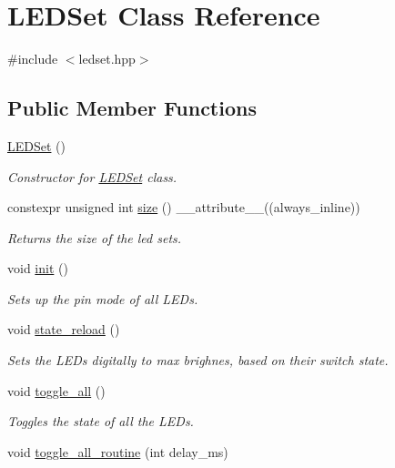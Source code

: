\hypertarget{classLEDSet}{}\section{L\+E\+D\+Set Class Reference}
\label{classLEDSet}


{\ttfamily \#include $<$ledset.\+hpp$>$}

\subsection*{Public Member Functions}
\begin{DoxyCompactItemize}
\item 
\hyperlink{classLEDSet_a4a65c9b26a11c2e62e65170d1088e201}{L\+E\+D\+Set} ()
\begin{DoxyCompactList}\small\item\em Constructor for \hyperlink{classLEDSet}{L\+E\+D\+Set} class. \end{DoxyCompactList}\item 
constexpr unsigned int \hyperlink{classLEDSet_a21b51a375a8487fb89deaa2fbd3701df}{size} () \+\_\+\+\_\+attribute\+\_\+\+\_\+((always\+\_\+inline))
\begin{DoxyCompactList}\small\item\em Returns the size of the led sets. \end{DoxyCompactList}\item 
void \hyperlink{classLEDSet_a907747547c2967c4db9597247c0acd9c}{init} ()
\begin{DoxyCompactList}\small\item\em Sets up the pin mode of all L\+E\+Ds. \end{DoxyCompactList}\item 
void \hyperlink{classLEDSet_a52d7a48f6639ce1df579e960e5a78890}{state\+\_\+reload} ()
\begin{DoxyCompactList}\small\item\em Sets the L\+E\+Ds digitally to max brighnes, based on their switch state. \end{DoxyCompactList}\item 
void \hyperlink{classLEDSet_a555f8e48ff0989647cba6de505db8a5d}{toggle\+\_\+all} ()
\begin{DoxyCompactList}\small\item\em Toggles the state of all the L\+E\+Ds. \end{DoxyCompactList}\item 
void \hyperlink{classLEDSet_a5ba8bc8d99267bcaa579fea860ebe7d0}{toggle\+\_\+all\+\_\+routine} (int delay\+\_\+ms)

\end{DoxyCompactItemize}
